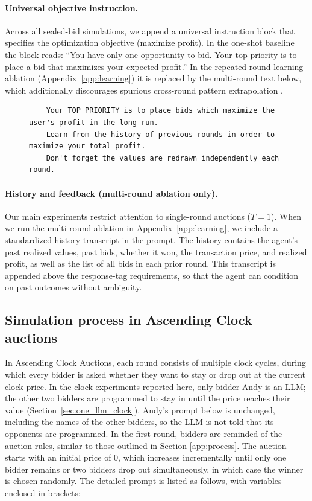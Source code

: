 \documentclass[acmsmall,screen,review]{acmart}
\newcommand{\rev}[1]{{\color{blue}#1}}
\newcommand{\rev}[1]{#1}
\begin{document}
\paragraph{Universal objective instruction.}
Across all sealed-bid simulations, we append a universal instruction block that specifies the optimization objective (maximize profit). In the one-shot baseline the block reads: ``You have only one opportunity to bid. Your top priority is to place a bid that maximizes your expected profit.'' In the repeated-round learning ablation (Appendix~\ref{app:learning}) it is replaced by the multi-round text below, which additionally discourages spurious cross-round pattern extrapolation \citep{fish2024algorithmic}.
\begin{figure}[htbp]
\centering
\begin{minipage}{0.95\textwidth}
\begin{lstlisting}
    Your TOP PRIORITY is to place bids which maximize the user's profit in the long run.
    Learn from the history of previous rounds in order to maximize your total profit.
    Don't forget the values are redrawn independently each round.
\end{lstlisting}
\end{minipage}
\end{figure}

\paragraph{History and feedback (multi-round ablation only).}
Our main experiments restrict attention to single-round auctions ($T=1$). When we run the multi-round ablation in Appendix~\ref{app:learning}, we include a standardized history transcript in the prompt. The history contains the agent's past realized values, past bids, whether it won, the transaction price, and realized profit, as well as the list of all bids in each prior round. This transcript is appended above the response-tag requirements, so that the agent can condition on past outcomes without ambiguity.


\subsection{Simulation process in Ascending Clock auctions}\label{app:dynamic}

In Ascending Clock Auctions, each round consists of multiple clock cycles, during which every bidder is asked whether they want to stay or drop out at the current clock price.
\rev{In the clock experiments reported here, only bidder Andy is an LLM; the other two bidders are programmed to stay in until the price reaches their value (Section~\ref{sec:one_llm_clock}). Andy's prompt below is unchanged, including the names of the other bidders, so the LLM is not told that its opponents are programmed.}
In the first round, bidders are reminded of the auction rules, similar to those outlined in Section \ref{app:process}.
The auction starts with an initial price of 0, which increases incrementally until only one bidder remains or two bidders drop out simultaneously, in which case the winner is chosen randomly.
The detailed prompt is listed as follows, with variables enclosed in brackets:
\end{document}
